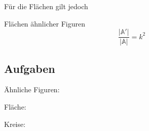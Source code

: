 \newpage


Für die Flächen gilt jedoch

\begin{gesetz}{Flächen ähnlicher Figuren}{}
$$\frac{|\mathbb{A'}|}{|\mathbb{A}|} = k^2$$
\end{gesetz}


\subsection*{Aufgaben}

Ähnliche Figuren:

Fläche:

Kreise:





